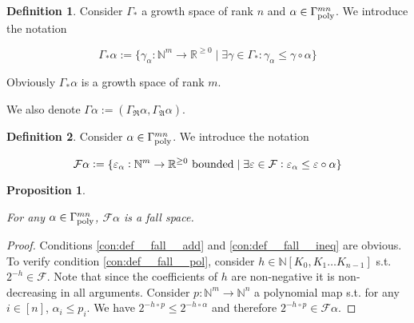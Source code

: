 \documentclass[11pt]{article}
\numberwithin{equation}{section}
\theoremstyle{definition}
\newtheorem{definition}{Definition}[section]
\theoremstyle{plain}
\newtheorem{proposition}{Proposition}[section]
\newcommand{\Nats}{\mathbb{N}}
\newcommand{\Reals}{\mathbb{R}}
\newcommand{\NatPoly}{\Nats[K_0, K_1 \ldots K_{n-1}]}
\newcommand{\GrowR}{\Gamma_{\mathfrak{R}}}
\newcommand{\GrowA}{\Gamma_{\mathfrak{A}}}
\newcommand{\Fall}{\mathcal{F}}
\newcommand{\GammaPoly}{\Gamma_{\textnormal{poly}}}
\begin{document}
\begin{samepage}
\begin{definition}

Consider ${\Gamma_*}$ a growth space of rank ${n}$ and ${\alpha \in \GammaPoly^{mn}}$. We introduce the notation

\begin{equation}
\label{eqn:tbd}
\Gamma_*\alpha:=\{\gamma_\alpha: \Nats^m \rightarrow \Reals^{\geq 0} \mid \exists \gamma \in \Gamma_*: \gamma_\alpha \leq \gamma \circ \alpha\}
\end{equation}

Obviously ${\Gamma_*\alpha}$ is a growth space of rank ${m}$.

We also denote ${\Gamma \alpha := (\GrowR \alpha, \GrowA \alpha)}$.

\end{definition}
\end{samepage}

\begin{samepage}
\begin{definition}

Consider ${\alpha \in \GammaPoly^{mn}}$. We introduce the notation

\begin{equation}
\label{eqn:tbd}
\Fall \alpha:=\{\varepsilon_\alpha: \Nats^m \rightarrow \Reals^{\geq 0} \textnormal{ bounded} \mid \exists \varepsilon \in \Fall: \varepsilon_\alpha \leq \varepsilon \circ \alpha\}
\end{equation}

\end{definition}
\end{samepage}

\begin{samepage}
\begin{proposition}
\label{prp:tbd}

For any ${\alpha \in \GammaPoly^{mn}}$, ${\Fall \alpha}$ is a fall space.

\end{proposition}
\end{samepage}

\begin{proof}

Conditions \ref{con:def__fall__add} and \ref{con:def__fall__ineq} are obvious. To verify condition \ref{con:def__fall__pol}, consider ${h \in \NatPoly}$ s.t. ${2^{-h} \in \Fall}$. Note that since the coefficients of ${h}$ are non-negative it is non-decreasing in all arguments. Consider ${p: \Nats^m \rightarrow \Nats^n}$ a polynomial map s.t. for any ${i \in [n]}$, ${\alpha_i \leq p_i}$. We have ${2^{-h \circ p} \leq 2^{-h \circ \alpha}}$ and therefore ${2^{-h \circ p} \in \Fall \alpha}$.
%
\end{proof}
\end{document}

